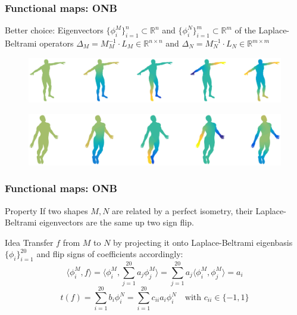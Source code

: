 \documentclass[compress]{beamer}
\begin{document}
\begin{frame}[fragile]
\frametitle{Functional maps: ONB}
Better choice:
Eigenvectors $\{\phi^M_i\}_{i=1}^n \subset \mathbb{R}^n$ and $\{\phi^N_i\}_{i=1}^m \subset \mathbb{R}^m$ of the Laplace-Beltrami operators $\Delta_M=M_M^{-1} \cdot L_M \in \mathbb{R}^{n \times n}$ and $\Delta_N=M_N^{-1} \cdot L_N \in \mathbb{R}^{m \times m}$
\begin{figure}[h]
	\centering
	\includegraphics[width=1.0\textwidth]{Michael.eps}
\end{figure}
  \begin{figure}[h]
	\centering
	\includegraphics[width=1.0\textwidth]{Michael1.eps}
\end{figure}

\end{frame}

\begin{frame}[fragile]
\frametitle{Functional maps: ONB}
\begin{block}{Property}
If two shapes $M, N$ are related by a perfect isometry, their Laplace-Beltrami eigenvectors are the same up two sign flip.
\end{block}
\begin{block}{Idea}
Transfer $f$ from $M$ to $N$ by projecting it onto Laplace-Beltrami eigenbasis $\{\phi_i\}_{i=1}^{20}$ and flip signs of coefficients accordingly:
$$
	 \langle \phi_i^M, f \rangle = \langle \phi_i^M, \sum_{j=1}^{20} a_j\phi_j^M \rangle = \sum_{j=1}^{20} a_j \langle \phi_i^M, \phi_j^M  \rangle = a_i 
$$
$$
	t(f) = \sum_{i=1}^{20} b_i \phi_i^N = \sum_{i=1}^{20} c_{ii} a_i \phi_i^N \quad \text{with } c_{ii} \in \{-1, 1\} 
$$
\end{block}
\end{frame}
\end{document}
